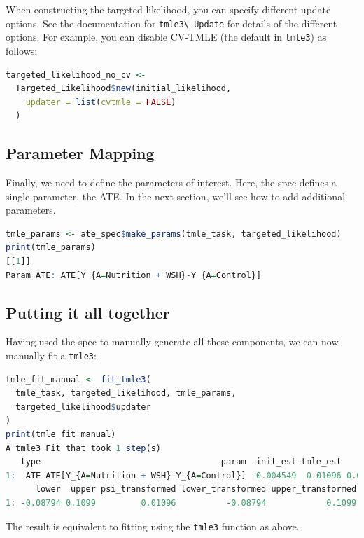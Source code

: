 \documentclass[
  12pt, krantz2,
]{krantz}
\newcommand{\passthrough}[1]{#1}
\newcommand{\1}{\mathbbm{1}}
\theoremstyle{definition}
\theoremstyle{definition}
\theoremstyle{definition}
\theoremstyle{definition}
\theoremstyle{remark}
\begin{document}
When constructing the targeted likelihood, you can specify different update
options. See the documentation for \passthrough{\lstinline!tmle3\_Update!} for details of the different
options. For example, you can disable CV-TMLE (the default in \passthrough{\lstinline!tmle3!}) as
follows:

\begin{lstlisting}[language=R]
targeted_likelihood_no_cv <-
  Targeted_Likelihood$new(initial_likelihood,
    updater = list(cvtmle = FALSE)
  )
\end{lstlisting}

\hypertarget{parameter-mapping}{%
\subsection{Parameter Mapping}\label{parameter-mapping}}

Finally, we need to define the parameters of interest. Here, the spec defines a
single parameter, the ATE. In the next section, we'll see how to add additional
parameters.

\begin{lstlisting}[language=R]
tmle_params <- ate_spec$make_params(tmle_task, targeted_likelihood)
print(tmle_params)
[[1]]
Param_ATE: ATE[Y_{A=Nutrition + WSH}-Y_{A=Control}]
\end{lstlisting}

\hypertarget{putting-it-all-together}{%
\subsection{Putting it all together}\label{putting-it-all-together}}

Having used the spec to manually generate all these components, we can now
manually fit a \passthrough{\lstinline!tmle3!}:

\begin{lstlisting}[language=R]
tmle_fit_manual <- fit_tmle3(
  tmle_task, targeted_likelihood, tmle_params,
  targeted_likelihood$updater
)
print(tmle_fit_manual)
A tmle3_Fit that took 1 step(s)
   type                                    param  init_est tmle_est      se
1:  ATE ATE[Y_{A=Nutrition + WSH}-Y_{A=Control}] -0.004549  0.01096 0.05046
      lower  upper psi_transformed lower_transformed upper_transformed
1: -0.08794 0.1099         0.01096          -0.08794            0.1099
\end{lstlisting}

The result is equivalent to fitting using the \passthrough{\lstinline!tmle3!} function as above.
\end{document}
